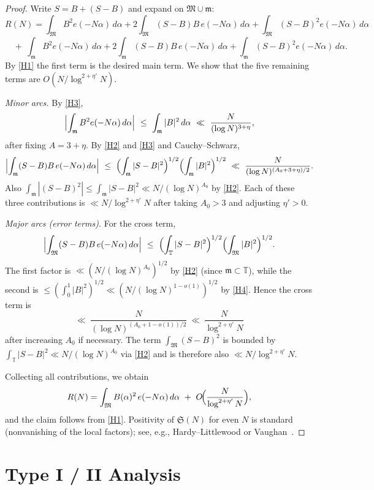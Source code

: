 \documentclass[11pt]{article}
\theoremstyle{definition}
\theoremstyle{remark}
\numberwithin{equation}{part}
\begin{document}
\begin{proof}
	Write $S=B+(S-B)$ and expand on $\mathfrak M\cup\mathfrak m$:
	\[
		R(N)=\int_{\mathfrak M} B^2 e(-N\alpha)\,d\alpha
		+ 2\!\int_{\mathfrak M} (S-B)B\,e(-N\alpha)\,d\alpha
		+ \int_{\mathfrak M} (S-B)^2 e(-N\alpha)\,d\alpha
	\]
	\[
		\quad +\ \int_{\mathfrak m} B^2 e(-N\alpha)\,d\alpha
		+ 2\!\int_{\mathfrak m} (S-B)B\,e(-N\alpha)\,d\alpha
		+ \int_{\mathfrak m} (S-B)^2 e(-N\alpha)\,d\alpha.
	\]
	By \ref{H1} the first term is the desired main term. We show that the five remaining terms are $O(N/\log^{2+\eta'}N)$.

	\emph{Minor arcs.} By \ref{H3},
	\[
		\Bigl|\int_{\mathfrak m} B^2 e(-N\alpha)\,d\alpha\Bigr|
		\ \le\ \int_{\mathfrak m}|B|^2\,d\alpha
		\ \ll\ \frac{N}{(\log N)^{3+\eta}},
	\]
	after fixing $A=3+\eta$.
	By \ref{H2} and \ref{H3} and Cauchy--Schwarz,
	\[
		\Bigl|\int_{\mathfrak m} (S-B)B\,e(-N\alpha)\,d\alpha\Bigr|
		\ \le\ \Bigl(\int_{\mathfrak m}|S-B|^2\Bigr)^{1/2}
		\Bigl(\int_{\mathfrak m}|B|^2\Bigr)^{1/2}
		\ \ll\ \frac{N}{(\log N)^{(A_0+3+\eta)/2}}.
	\]
	Also $\int_{\mathfrak m}|(S-B)^2| \le \int_{\mathfrak m}|S-B|^2 \ll N/(\log N)^{A_0}$ by \ref{H2}. Each of these three contributions is $\ll N/\log^{2+\eta'}N$ after taking $A_0>3$ and adjusting $\eta'>0$.

	\emph{Major arcs (error terms).} For the cross term,
	\[
		\Bigl|\int_{\mathfrak M} (S-B)B\,e(-N\alpha)\,d\alpha\Bigr|
		\ \le\ \Bigl(\int_{\mathbb T}|S-B|^2\Bigr)^{1/2}
		\Bigl(\int_{\mathfrak M}|B|^2\Bigr)^{1/2}.
	\]
	The first factor is $\ll (N/(\log N)^{A_0})^{1/2}$ by \ref{H2} (since $\mathfrak m\subset\mathbb T$), while the second is $\le (\int_0^1|B|^2)^{1/2}\ll (N/(\log N)^{1-o(1)})^{1/2}$ by \ref{H4}. Hence the cross term is
	\[
		\ll\ \frac{N}{(\log N)^{(A_0+1-o(1))/2}}
		\ \ll\ \frac{N}{\log^{2+\eta'}N}
	\]
	after increasing $A_0$ if necessary. The term $\int_{\mathfrak M}(S-B)^2$ is bounded by $\int_{\mathbb T}|S-B|^2\ll N/(\log N)^{A_0}$ via \ref{H2} and is therefore also $\ll N/\log^{2+\eta'}N$.

	Collecting all contributions, we obtain
	\[
		R(N)=\int_{\mathfrak M} B(\alpha)^2\,e(-N\alpha)\,d\alpha\ +\ O\!\Bigl(\frac{N}{\log^{2+\eta'}N}\Bigr),
	\]
	and the claim follows from \ref{H1}. Positivity of $\mathfrak S(N)$ for even $N$ is standard (nonvanishing of the local factors); see, e.g., Hardy--Littlewood or Vaughan~\cite[\S3.6]{VaughanHL}.
\end{proof}


\part{Type I / II Analysis}\label{part:typeI-II}
\end{document}
